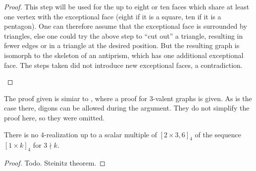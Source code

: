 \begin{lemma}
\begin{proof}
    This step will be used for the up to eight or ten faces which share at least one vertex with the exceptional face (eight if it is a square, ten if it is a pentagon). One can therefore assume that the exceptional face is surrounded by triangles, else one could try the above step to ``cut out'' a triangle, resulting in fewer edges or in a triangle at the desired position. But the resulting graph is isomorph to the skeleton of an antiprism, which has one additional exceptional face. The steps taken did not introduce new exceptional faces, a contradiction.
    \begin{figure}[htpp]
      \centering
    \end{figure}
  \end{proof}
\end{lemma}
\begin{remark}
  The proof given is simiar to \cite{ConvexPolytopes}, where a proof for $3$-valent graphs is given. As is the case there, digons can be allowed during the argument. They do not simplify the proof here, so they were omitted.
\end{remark}
\begin{corollary}
  There is no 4-realization up to a scalar multiple of $[2 \times 3, 6]_4$ of the sequence $[1 \times k]_4$ for $3 \nmid k$.
  \begin{proof}
    Todo. Steinitz theorem.
  \end{proof}
\end{corollary}



